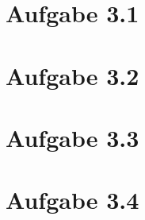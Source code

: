 \documentclass{theozettel}
\begin{document}

\section*{Aufgabe 3.1}


\newpage
\section*{Aufgabe 3.2}


\newpage
\section*{Aufgabe 3.3}


\newpage
\section*{Aufgabe 3.4}
\end{document}
